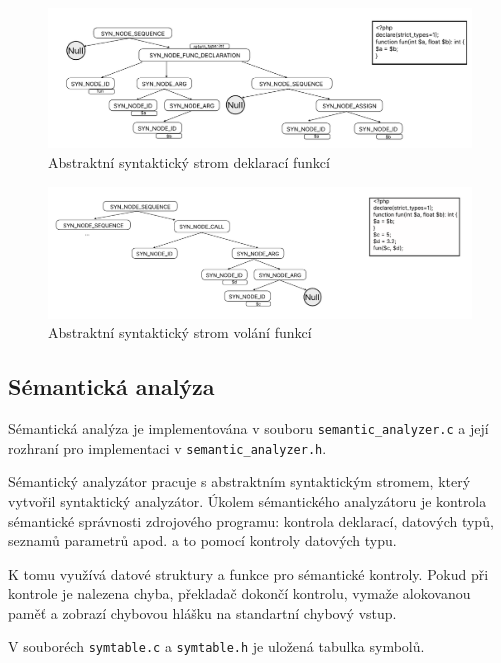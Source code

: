 \documentclass[a4paper, 11pt]{article}
\begin{document}
    \begin{figure}[!ht]
		\centering
		\includegraphics[width=1\linewidth]{func_dec.pdf}
		\caption{Abstraktní syntaktický strom deklarací funkcí}
		\label{figure:ast_example3}
	\end{figure}

    \begin{figure}[!ht]
		\centering
		\includegraphics[width=1\linewidth]{fun_call.pdf}
		\caption{Abstraktní syntaktický strom volání funkcí}
		\label{figure:ast_example4}
	\end{figure}
    \newpage

	\subsection{Sémantická analýza}
	Sémantická analýza je implementována v souboru \texttt{semantic\_analyzer.c} a její rozhraní pro implementaci
	v \texttt{semantic\_analyzer.h}.

    Sémantický analyzátor pracuje s abstraktním syntaktickým stromem, který
	vytvořil syntaktický analyzátor. Úkolem sémantického analyzátoru je kontrola sémantické správnosti zdrojového
	programu: kontrola deklarací, datových typů, seznamů parametrů apod. a to pomocí kontroly datových typu.

    K tomu využívá datové struktury a funkce pro sémantické kontroly. Pokud při kontrole je nalezena chyba, překladač dokončí
	kontrolu, vymaže alokovanou paměť a zobrazí chybovou hlášku na standartní chybový vstup.

    V souboréch \texttt{symtable.c} a \texttt{symtable.h} je uložená tabulka symbolů.
\end{document}
